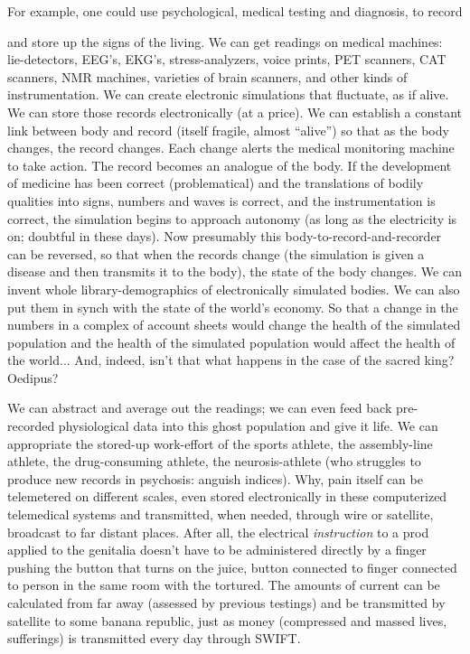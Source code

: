 \documentclass[11pt,twoside,draft]{memoir}
\begin{document}
For example, one could use psychological, medical testing and diagnosis, to record

and store up the signs of the living. We can
get readings on medical machines: lie-detectors, EEG's, EKG's, stress-analyzers, voice
prints, PET scanners, CAT scanners, NMR
machines, varieties of brain scanners, and
other kinds of instrumentation. We can
create electronic simulations that fluctuate,
as if alive. We can store those records electronically (at a price). We can establish a
constant link between body and record (itself fragile, almost \enquote{alive}) so that as the
body changes, the record changes. Each change alerts the medical monitoring machine to take action. The record becomes an
analogue of the body. If the development of
medicine has been correct (problematical)
and the translations of bodily qualities into
signs, numbers and waves is correct, and the
instrumentation is correct, the simulation
begins to approach autonomy (as long as the
electricity is on; doubtful in these days).
Now presumably this body-to-record-and-recorder can be reversed, so that when the
records change (the simulation is given a
disease and then transmits it to the body),
the state of the body changes. We can invent
whole library-demographics of electronically
simulated bodies. We can also put them in
synch with the state of the world's economy.
So that a change in the numbers in a complex
of account sheets would change the health of
the simulated population and the health of
the simulated population would affect the
health of the world... And, indeed, isn't that
what happens in the case of the sacred king?
Oedipus?

We can abstract and average out the readings; we can even feed back pre-recorded
physiological data into this ghost population and give it life. We can appropriate the
stored-up work-effort of the sports athlete,
the assembly-line athlete, the drug-consuming athlete, the neurosis-athlete (who struggles to produce new records in psychosis:
anguish indices). Why, pain itself can be
telemetered on different scales, even stored
electronically in these computerized telemedical systems and transmitted, when
needed, through wire or satellite, broadcast
to far distant places. After all, the electrical
\emph{instruction} to a prod applied to the genitalia
doesn't have to be administered directly by a
finger pushing the button that turns on the
juice, button connected to finger connected
to person in the same room with the tortured.
The amounts of current can be calculated
from far away (assessed by previous testings)
and be transmitted by satellite to some
banana republic, just as money (compressed
and massed lives, sufferings) is transmitted
every day through SWIFT.
\end{document}
